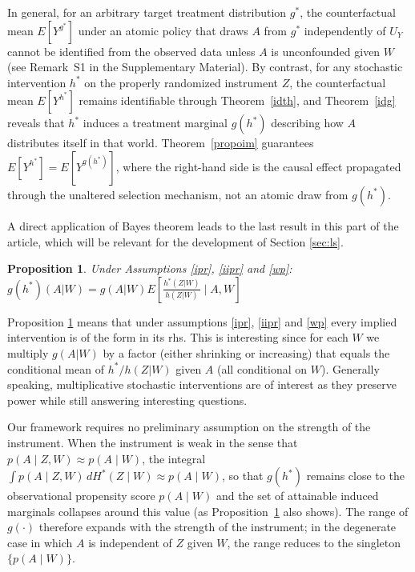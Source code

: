\documentclass[12pt]{article}
\theoremstyle{thmstyleone}%
\newtheorem{propo}[theo]{Proposition}%
\theoremstyle{thmstyletwo}%
\theoremstyle{thmstylethree}%
\begin{document}
 {In general, for an arbitrary target treatment distribution $g^*$, the counterfactual mean $E[Y^{g^*}]$ under an atomic policy that draws $A$ from $g^*$ independently of $U_Y$ cannot be identified from the observed data unless $A$ is unconfounded given $W$ (see Remark~S1 in the Supplementary Material). By contrast, for any stochastic intervention $h^*$ on the properly randomized instrument $Z$, the counterfactual mean $E[Y^{h^*}]$ remains identifiable through Theorem~\ref{idth}, and Theorem~\ref{idg} reveals that $h^*$ induces a treatment marginal $g(h^*)$ describing how $A$ distributes itself in that world. Theorem~\ref{propoim} guarantees $E[Y^{h^*}] = E[Y^{g(h^*)}]$, where the right-hand side is the causal effect propagated through the unaltered selection mechanism, not an atomic draw from $g(h^*)$.}



A direct application of Bayes theorem leads to the last result in this part of the article, which will be relevant for the development of Section \ref{sec:ls}. 

\begin{propo}\label{bayes}Under Assumptions \ref{ipr}, \ref{iipr} and \ref{wp}: $g(h^*)(A|W)= g(A|W)E\left[ \frac{h^*(Z|W)}{h(Z|W)} \mid A,W\right]$
\end{propo}

Proposition \ref{bayes} means that under assumptions \ref{ipr}, \ref{iipr} and \ref{wp} every implied intervention is of the form in its rhs. This is interesting since for each $W$ we multiply $g(A|W)$ by a factor (either shrinking or increasing) that equals the  {conditional} mean of $h^*/h(Z|W)$ given $A$ (all conditional on $W$).  Generally speaking, multiplicative stochastic interventions are of interest as they preserve power while still answering interesting questions.



 {Our framework requires no preliminary assumption on the strength of the instrument. When the instrument is weak in the sense that $p(A\mid Z,W)\approx p(A\mid W)$, the integral $\int p(A\mid Z,W)\,dH^*(Z\mid W) \approx p(A\mid W)$, so that $g(h^*)$ remains close to the observational propensity score $p(A\mid W)$ and the set of attainable induced marginals collapses around this value (as Proposition~\ref{bayes} also shows). The range of $g(\cdot)$ therefore expands with the strength of the instrument; in the degenerate case in which $A$ is independent of $Z$ given $W$, the range reduces to the singleton $\{p(A\mid W)\}$.}
\end{document}
